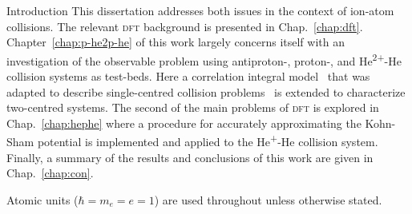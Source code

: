 \documentclass[letterpaper, 11 pt]{report}
\begin{document}
\begin{chapter}{Introduction \label{chap:intro}}
   This dissertation addresses both issues in the context of ion-atom collisions. The relevant
   \textsc{dft} background is presented in Chap.~\ref{chap:dft}. Chapter~\ref{chap:p-he2p-he} of this
   work largely concerns itself with an investigation of the observable problem using antiproton-,
   proton-, and He\textsuperscript{2+}-He collision systems as test-beds. Here a correlation integral
   model~\cite{wb} that was adapted to describe single-centred collision problems~\cite{pbarhe} is
   extended to characterize two-centred systems. The second of the main problems of \textsc{dft} is
   explored in Chap.~\ref{chap:hephe} where a procedure for accurately approximating the Kohn-Sham
   potential is implemented and applied to the He\textsuperscript{+}-He collision system. Finally, a
   summary of the results and conclusions of this work are given in Chap.~\ref{chap:con}.

   Atomic units ($\hbar = m_e = e = 1$) are used throughout unless otherwise stated.

\end{chapter}
\end{document}
